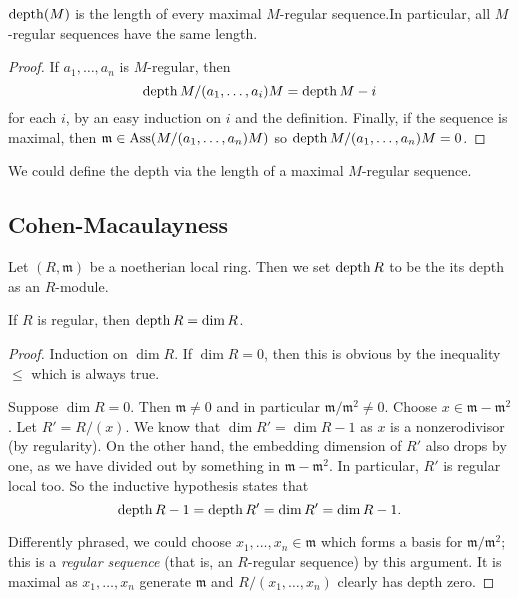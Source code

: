 \begin{corollary}
$\operatorname{depth}(M)$ is the length of every maximal $M$-regular
sequence.In particular,
all $M$-regular sequences have the same length.
\end{corollary}

\begin{proof}
If $a_1, \dots, a_n$ is $M$-regular, then
\[ \operatorname{depth} M/(a_1, \dots, a_i)M = \operatorname{depth} M -i  \]
for each $i$, by an easy induction on $i$ and the definition.
Finally, if the sequence is maximal,
then $\mathfrak{m} \in \operatorname{Ass}(M/(a_1, \dots, a_n)M)$ so $\operatorname{depth}
M/(a_1, \dots,
a_n) M = 0$.
\end{proof}

\begin{remark}
We could define the depth via the length of a maximal
$M$-regular sequence.
\end{remark}


\subsection{Cohen-Macaulayness}

\begin{definition}
Let $(R, \mathfrak{m})$ be a noetherian local ring. Then
we set $\operatorname{depth} R$ to be the its depth as an $R$-module.
\end{definition}




\begin{example}
If $R$ is regular, then $\operatorname{depth} R = \dim R$.
\end{example}
\begin{proof}
Induction on $\dim R$. If $\dim R=0$, then this is obvious by
the inequality
$\leq $ which is always true.

Suppose $\dim R = 0$. Then $\mathfrak{m} \neq 0$ and in
particular
$\mathfrak{m}/\mathfrak{m}^2 \neq 0$. Choose $x \in
\mathfrak{m}-
\mathfrak{m}^2$. Let $R'=R/(x)$. We know that $\dim R' = \dim
R-1$ as $x$ is a
nonzerodivisor (by regularity). On the other hand, the embedding
dimension of $R'$ also drops
by one, as we have divided out by something in $\mathfrak{m} -
\mathfrak{m}^2$.
In particular, $R'$ is regular local too. So the inductive
hypothesis states
that
\[\operatorname{depth} R-1 =  \operatorname{depth} R' = \dim R' = \dim R -1.   \]

Differently phrased, we could choose $x_1, \dots, x_n \in
\mathfrak{m}$ which forms a basis for
$\mathfrak{m}/\mathfrak{m}^2$; this is a
\emph{regular sequence} (that is, an $R$-regular sequence) by
this argument. It
is maximal as $x_1, \dots, x_n$ generate $\mathfrak{m}$ and
$R/(x_1, \dots,
x_n)$ clearly has depth zero.
\end{proof}

